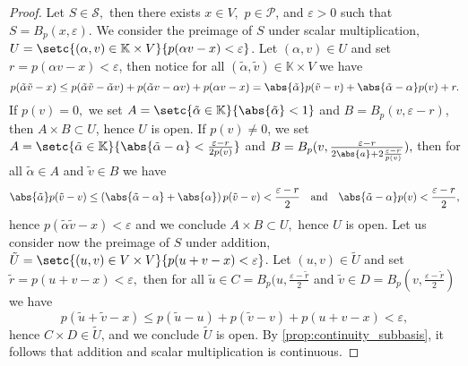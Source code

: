 \begin{proof}
    Let \(S \in \mathcal{S},\) then there exists \(x \in V,\) \(p \in \mathcal{P}\), and \(\varepsilon > 0\) such that \(S = B_p(x, \varepsilon)\). We consider the preimage of \(S\) under scalar multiplication, \(U = \setc{(\alpha, v) \in \mathbb{K} \times V}{p(\alpha v - x) < \varepsilon}\). Let \((\alpha, v) \in U\) and set \(r = p(\alpha v - x) < \varepsilon\), then notice for all \((\tilde{\alpha}, \tilde{v}) \in \mathbb{K} \times V\) we have
    \begin{equation*}
        p(\tilde{\alpha}\tilde{v} - x) \leq p(\tilde{\alpha}\tilde{v} - \tilde{\alpha} v) + p(\tilde{\alpha} v -  \alpha v) + p(\alpha v - x) = \abs{\tilde{\alpha}} p(\tilde{v} - v) + \abs{\tilde{\alpha} - \alpha} p(v) + r.
    \end{equation*}
    If \(p(v) = 0,\) we set \(A = \setc{\tilde{\alpha} \in \mathbb{K}}{\abs{\tilde{\alpha}} < 1}\) and \(B = B_p(v, \varepsilon - r)\), then \(A \times B \subset U\), hence \(U\) is open. If \(p(v) \neq 0\), we set \(A = \setc{\tilde{\alpha} \in \mathbb{K}}{\abs{\tilde{\alpha} - \alpha} < \frac{\varepsilon - r}{2p(v)}}\) and \(B = B_p(v, \frac{\varepsilon - r}{2\abs{a} + 2\frac{\varepsilon - r}{p(v)}}),\) then for all \(\tilde{\alpha} \in A\) and \(\tilde{v} \in B\) we have
    \begin{equation*}
        \abs{\tilde{\alpha}} p(\tilde{v} - v) \leq \left(\abs{\tilde{\alpha} - \alpha} + \abs{\alpha}\right) p(\tilde{v} - v) < \frac{\varepsilon - r}{2}
        \quad\text{and}\quad
        \abs{\tilde{\alpha} - \alpha} p(v) < \frac{\varepsilon - r}{2},
    \end{equation*}
    hence \(p(\tilde{\alpha} \tilde{v} - x) < \varepsilon\) and we conclude \(A \times B \subset U,\) hence \(U\) is open. Let us consider now the preimage of \(S\) under addition, \(\tilde{U} = \setc{(u,v) \in V\times V}{p(u + v - x) < \varepsilon}\). Let \((u,v) \in \tilde{U}\) and set \(\tilde{r} = p(u + v - x) < \varepsilon,\) then for all \(\tilde{u} \in C = B_p(u, \frac{\varepsilon - \tilde{r}}{2}\) and \(\tilde{v} \in D = B_p(v, \frac{\varepsilon - \tilde{r}}{2})\) we have
    \begin{equation*}
        p(\tilde{u} + \tilde{v} - x) \leq p(\tilde{u} - u) + p(\tilde{v} - v) + p(u + v - x) < \varepsilon,
    \end{equation*}
    hence \(C \times D \in \tilde{U}\), and we conclude \(\tilde{U}\) is open. By \cref{prop:continuity_subbasis}, it follows that addition and scalar multiplication is continuous.
\end{proof}

